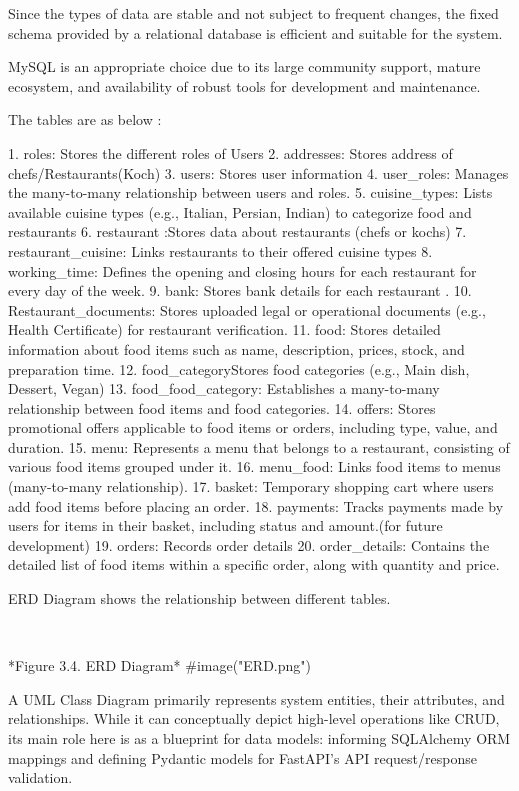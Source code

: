 Since the types of data are stable and not subject to frequent changes, the fixed schema provided by a relational database is efficient and suitable for the system.

MySQL is an appropriate choice due to its large community support, mature ecosystem, and availability of robust tools for development and maintenance.

The tables are as below :

1. roles: Stores the different roles of Users
2. addresses: Stores address of chefs/Restaurants(Koch)
3. users: Stores user information 
4. user_roles: Manages the many-to-many relationship between users and roles.
5. cuisine_types: Lists available cuisine types (e.g., Italian, Persian, Indian) to categorize food and restaurants
6. restaurant :Stores data about restaurants (chefs or kochs)
7. restaurant_cuisine: Links restaurants to their offered cuisine types
8. working_time: Defines the opening and closing hours for each restaurant for every day of the week.
9. bank: Stores bank details for each restaurant .
10. Restaurant_documents: Stores uploaded legal or operational documents (e.g., Health Certificate) for restaurant verification.
11. food: Stores detailed information about food items such as name, description, prices, stock, and preparation time.
12. food_categoryStores food categories (e.g., Main dish, Dessert, Vegan)
13. food_food_category: Establishes a many-to-many relationship between food items and food categories.
14. offers: Stores promotional offers applicable to food items or orders, including type, value, and duration.
15. menu: Represents a menu that belongs to a restaurant, consisting of various food items grouped under it.
16. menu_food: Links food items to menus (many-to-many relationship).
17. basket: Temporary shopping cart where users add food items before placing an order.
18. payments: Tracks payments made by users for items in their basket, including status and amount.(for future development)
19. orders: Records order details 
20. order_details: Contains the detailed list of food items within a specific order, along with quantity and price.

ERD Diagram shows the relationship between different tables.

\


*Figure 3.4. ERD Diagram* 
#image("ERD.png")
\
\

A UML Class Diagram primarily represents system entities, their attributes, and relationships. While it can conceptually depict high-level operations like CRUD, its main role here is as a blueprint for data models: informing SQLAlchemy ORM mappings and defining Pydantic models for FastAPI's API request/response validation.
\
\
\
\
\
\
\



